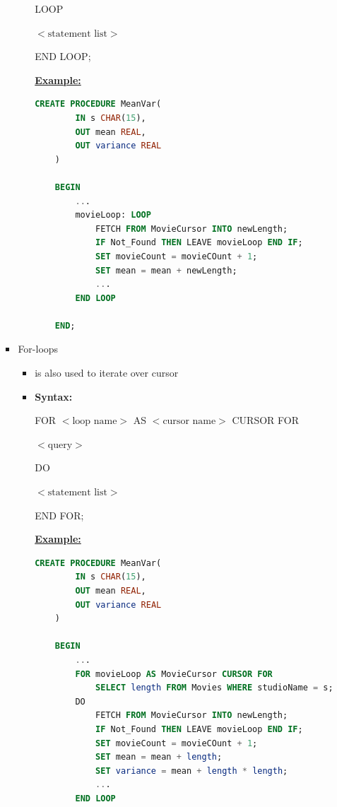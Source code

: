 \documentclass[12pt]{article}
\begin{document}
\begin{enumerate}[1.]
\begin{enumerate}[a)]
\begin{itemize}
\begin{itemize}
            \bigskip

            LOOP

            $<\text{statement list}>$

            END LOOP;

            \bigskip

            \underline{\textbf{Example:}}

            \bigskip

    \begin{lstlisting}[language=SQL]
    CREATE PROCEDURE MeanVar(
        IN s CHAR(15),
        OUT mean REAL,
        OUT variance REAL
    )

    BEGIN
        ...
        movieLoop: LOOP
            FETCH FROM MovieCursor INTO newLength;
            IF Not_Found THEN LEAVE movieLoop END IF;
            SET movieCount = movieCOunt + 1;
            SET mean = mean + newLength;
            ...
        END LOOP

    END;
    \end{lstlisting}
        \end{itemize}

        \item For-loops
        \begin{itemize}
            \item is also used to iterate over cursor
            \item \textbf{Syntax:}
            \bigskip

            FOR $<\text{loop name}>$ AS $<\text{cursor name}>$ CURSOR FOR

            $<\text{query}>$

            DO

            $<\text{statement list}>$

            END FOR;

            \bigskip

            \underline{\textbf{Example:}}

            \bigskip

    \begin{lstlisting}[language=SQL]
    CREATE PROCEDURE MeanVar(
        IN s CHAR(15),
        OUT mean REAL,
        OUT variance REAL
    )

    BEGIN
        ...
        FOR movieLoop AS MovieCursor CURSOR FOR
            SELECT length FROM Movies WHERE studioName = s;
        DO
            FETCH FROM MovieCursor INTO newLength;
            IF Not_Found THEN LEAVE movieLoop END IF;
            SET movieCount = movieCOunt + 1;
            SET mean = mean + length;
            SET variance = mean + length * length;
            ...
        END LOOP


\end{lstlisting}
\end{itemize}
\end{itemize}
\end{enumerate}
\end{enumerate}
\end{document}
